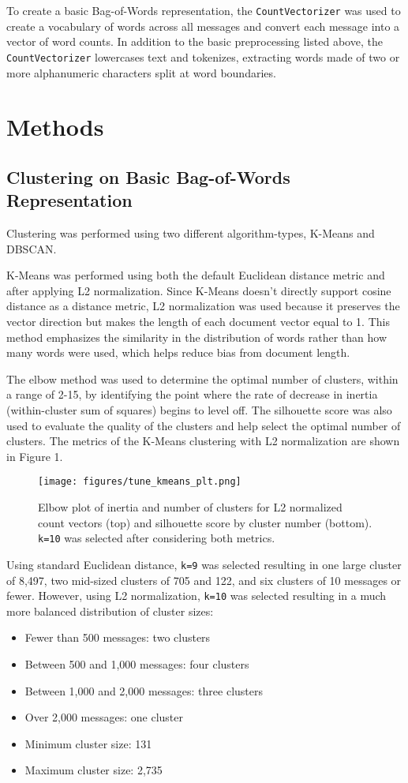 \documentclass{article}      %
\begin{document}
To create a basic Bag-of-Words representation, the \texttt{CountVectorizer} was used to create a vocabulary of words across all messages and convert each message into a vector of word counts. In addition to the basic preprocessing listed above, the \texttt{CountVectorizer} lowercases text and tokenizes, extracting words made of two or more alphanumeric characters split at word boundaries.

\section{Methods}

\subsection{Clustering on Basic Bag-of-Words Representation}
Clustering was performed using two different algorithm-types, K-Means and DBSCAN.

K-Means was performed using both the default Euclidean distance metric and after applying L2 normalization. Since K-Means doesn't directly support cosine distance as a distance metric, L2 normalization was used because it preserves the vector direction but makes the length of each document vector equal to 1. This method emphasizes the similarity in the distribution of words rather than how many words were used, which helps reduce bias from document length.

The elbow method was used to determine the optimal number of clusters, within a range of 2-15, by identifying the point where the rate of decrease in inertia (within-cluster sum of squares) begins to level off. The silhouette score was also used to evaluate the quality of the clusters and help select the optimal number of clusters. The metrics of the K-Means clustering with L2 normalization are shown in Figure 1.

\begin{figure}[!h]
	\centering
	\texttt{[image: figures/tune\_kmeans\_plt.png]}
	\caption{Elbow plot of inertia and number of clusters for L2 normalized count vectors (top) and silhouette score by cluster number (bottom). \texttt{k=10} was selected after considering both metrics.}
	\label{fig:kmeans_elbow}
\end{figure}

Using standard Euclidean distance, \texttt{k=9} was selected resulting in one large cluster of 8,497, two mid-sized clusters of 705 and 122, and six clusters of 10 messages or fewer. However, using L2 normalization, \texttt{k=10} was selected resulting in a much more balanced distribution of cluster sizes:
\begin{itemize}
    \item Fewer than 500 messages: two clusters
    \item Between 500 and 1,000 messages: four clusters
    \item Between 1,000 and 2,000 messages: three clusters
    \item Over 2,000 messages: one cluster
    \item Minimum cluster size: 131
    \item Maximum cluster size: 2,735
\end{itemize}
\end{document}
